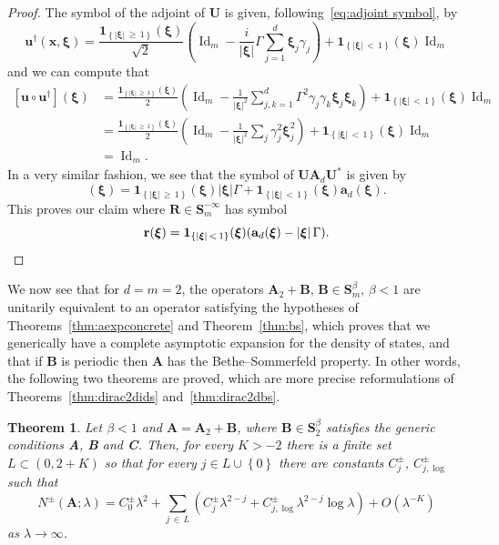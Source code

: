 \documentclass[10pt]{amsart}
\newtheorem{theo}{Theorem}[section]
\theoremstyle{definition}\newtheorem{defi}[theo]{Definition}\newtheorem{rema}[theo]{Remark}\newtheorem{exam}[theo]{Example}\newtheorem{nota}[theo]{Notation}
\DeclareMathOperator{\Id}{Id}
\newcommand{\bxi}{\boldsymbol \xi}
\newcommand{\bone}{\boldsymbol 1}
\newcommand{\ba}{\mathbf a}
\newcommand{\BA}{\mathbf A}
\newcommand{\BB}{\mathbf B}
\newcommand{\BS}{\mathbf S}
\newcommand{\BR}{\mathbf R}
\newcommand{\BU}{\mathbf U}
\newcommand{\bx}{\mathbf x}
\newcommand{\br}{\mathbf r}
\newcommand{\bu}{\mathbf u}
\newcommand{\bigo}[1]{O\left(#1 \right)}
\newcommand{\abs}[1]{\left\lvert #1 \right\rvert}
\newcommand{\set}[1]{\left\{ #1 \right\}}
\begin{document}
\begin{proof}
The symbol of the adjoint of $\BU$ is given, following~\eqref{eq:adjoint symbol}, by
\begin{equation}
\bu^\dagger(\bx,\bxi) = \frac{\bone_{\set{\abs \bxi\,\ge\,1}}(\bxi)}{\sqrt 2}\left(\Id_m - \frac{i}{\abs \bxi} \Gamma
\sum_{j=1}^d \bxi_j \gamma_j\right) + \bone_{\set{\abs{\bxi}\,<\,1}}(\bxi)
\Id_m
\end{equation}
and we can compute that
\begin{equation}
\begin{aligned}
\left[\bu\circ \bu^\dagger \right] (\bxi) &= \frac{\bone_{\set{\abs \bxi
\,\ge\,1}}(\bxi)}{2}\left(\Id_m -
\frac{1}{\abs{\bxi}^2} \sum_{j,k = 1}^d \Gamma^2 \gamma_j \gamma_k \bxi_j
\bxi_k\right) + \bone_{\set{\abs \bxi\,< \,1}}(\bxi) \Id_m \\
&= \frac{\bone_{\set{ \abs \bxi\,\ge\,1}}(\bxi)}{2} \left(\Id_m - \frac{1}{\abs{\bxi}^2} \sum_j \gamma_j^2
\bxi_j^2\right) + \bone_{\set{\abs \bxi\,< \,1}}(\bxi) \Id_m\\
&= \Id_m.
\end{aligned}
\end{equation}
In a very similar fashion, we see that the symbol of $\BU \BA_d \BU^*$ is given by
\begin{equation}
[\bu \circ \ba_d \circ \bu^\dagger](\bxi) = \bone_{\set{\abs \bxi\,\ge\,1 }}(\bxi) \abs \bxi\Gamma + \bone_{\set{\abs \bxi\,<\,1}}(\bxi) \ba_d(\bxi).
\end{equation}
This proves our claim where $\BR \in \BS_m^{-\infty}$ has symbol
\begin{equation}
\br(\bxi)= \bone_{\set{\abs \bxi\,<\,1}} (\bxi) (\ba_d(\bxi) - \abs \bxi
\Gamma).\qedhere
\end{equation}
\end{proof}

We now see that for $d = m = 2$, the operators $\BA_2 + \BB$, $\BB \in \BS^\beta_m$, $\beta < 1$ are unitarily equivalent to an operator satisfying the hypotheses of Theorems~\ref{thm:aexpconcrete} and Theorem~\ref{thm:bs}, which proves that we generically have a complete asymptotic expansion for the density of states, and that if $\BB$ is periodic then $\BA$ has the Bethe--Sommerfeld property. In other words, the following two theorems are proved, which are more precise reformulations of Theorems~\ref{thm:dirac2dids} and~\ref{thm:dirac2dbs}.

\begin{theo}
Let $\beta < 1$ and $\BA = \BA_2 + \BB$, where $\BB \in \BS_2^\beta$ satisfies the generic conditions \textbf{A}, \textbf B and \textbf C. Then, for every $K > - 2$ there is a finite set $L \subset (0,2+K)$ so that for every $j \in L
\cup \set{0}$ there are constants $C_{j}^\pm$, $C_{j,\log}^\pm$ such that
\begin{equation}
N^\pm(\BA; \lambda) = C_0^\pm \lambda^2 + \sum_{j\,\in\,L} \left(C_j^\pm
\lambda^{2 - j} + C_{j,\log}^\pm \lambda^{2-j} \log \lambda \right) +
\bigo{\lambda^{-K}}
\end{equation}
as $\lambda \to \infty$.
\end{theo}
\end{document}
